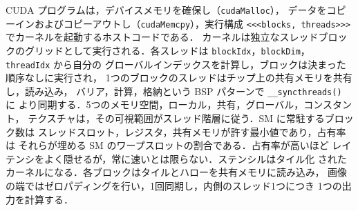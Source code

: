 \documentclass[../main.tex]{subfiles}
\begin{document}
\begin{keypoint}[章のまとめ]
  CUDA プログラムは，デバイスメモリを確保し（\texttt{cudaMalloc}），
  データをコピーインおよびコピーアウトし（\texttt{cudaMemcpy}），実行構成
  \texttt{<<<blocks, threads>>>} でカーネルを起動するホストコードである．
  カーネルは独立なスレッドブロックのグリッドとして実行される．各スレッドは
  \texttt{blockIdx}，\texttt{blockDim}，\texttt{threadIdx} から自分の
  グローバルインデックスを計算し，ブロックは決まった順序なしに実行され，
  1つのブロックのスレッドはチップ上の共有メモリを共有し，読み込み，
  バリア，計算，格納という BSP パターンで \texttt{\_\_syncthreads()} に
  より同期する．5つのメモリ空間，ローカル，共有，グローバル，コンスタント，
  テクスチャは，その可視範囲がスレッド階層に従う．SM に常駐するブロック数は
  スレッドスロット，レジスタ，共有メモリが許す最小値であり，占有率は
  それらが埋める SM のワープスロットの割合である．占有率が高いほど
  レイテンシをよく隠せるが，常に速いとは限らない．ステンシルはタイル化
  されたカーネルになる．各ブロックはタイルとハローを共有メモリに読み込み，
  画像の端ではゼロパディングを行い，1回同期し，内側のスレッド1つにつき
  1つの出力を計算する．
\end{keypoint}
\end{document}
